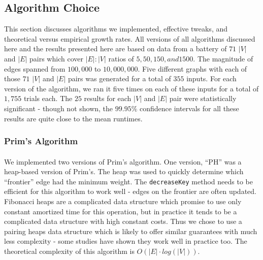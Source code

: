 \subsection{Algorithm Choice}
\label{sec:deep:algchoice}
This section discusses algorithms we implemented, effective tweaks, and
theoretical versus empirical growth rates.  All versions of all algorithms
discussed here and the results presented here are based on data from a battery
of $71$ $|V|$ and $|E|$ pairs which cover $|E|:|V|$ ratios of $5, 50, 150, and
1500$.  The magnitude of edges spanned from $100,000$ to $10,000,000$.  Five
different graphs with each of those $71$ $|V|$ and $|E|$ pairs was generated for
a total of $355$ inputs.  For each version of the algorithm, we ran it five
times on each of these inputs for a total of $1,755$ trials each.  The $25$
results for each $|V|$ and $|E|$ pair were statistically significant - though
not shown, the $99.95\%$ confidence intervals for all these results are quite
close to the mean runtimes.


\subsubsection{Prim's Algorithm}
\paragraph{}
We implemented two versions of Prim's algorithm.  One version, ``PH'' was a
heap-based version of Prim's.  The heap was used to quickly determine which
``frontier'' edge had the minimum weight.  The \texttt{decreaseKey} method needs
to be efficient for this algorithm to work well - edges on the frontier are
often updated.  Fibonacci heaps are a complicated data structure which promise
to use only constant amortized time for this operation, but in practice it tends
to be a complicated data structure with high constant costs.  Thus we chose to
use a pairing heaps data structure which is likely to offer similar guarantees
with much less complexity - some studies\cite{moret} have shown they work well
in practice too.  The theoretical complexity of this algorithm is $O(|E| \cdot
log(|V|))$.

